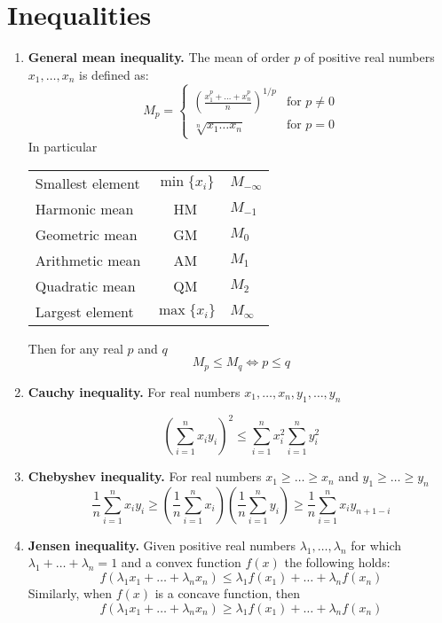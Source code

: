 \documentclass{article}
\begin{document}
\section*{Inequalities}
	\begin{enumerate}
	\item \textbf{General mean inequality.}
	The mean of order $p$ of positive real numbers $x_1,\dots,x_n$ is defined as:
	$$M_p=
	\begin{cases}
	\left(\frac{x_1^p+ \dots + x_n^p}{n}\right)^{1/p} &\text{for } p \ne 0 \\
	\sqrt[n]{x_1 \dots x_n}                           &\text{for } p=0
	\end{cases}
	$$
	In particular 
	\begin{center}
		\begin{tabular}{lcl}
			Smallest element & $\min\{x_i\}$ & $M_{-\infty}$ \\
			Harmonic mean & HM & $M_{-1}$ \\
			Geometric mean & GM & $M_0$ \\
			Arithmetic mean & AM & $M_1$ \\
			Quadratic mean & QM & $M_2$ \\			
			Largest element & $\max\{x_i\}$ & $M_{\infty}$ 
		\end{tabular}
	\end{center}
	Then for any real $p$ and $q$
	$$M_p \leq M_q \iff p \leq q $$

	\item \textbf{Cauchy inequality.}
	For real numbers $x_1, \dots , x_n, y_1, \dots , y_n$
	
	$$\left(\sum_{i=1}^{n} x_i y_i\right)^2 \leq \sum_{i=1}^{n} x_i^2 \sum_{i=1}^{n} y_i^2 $$
	 
	\item \textbf{Chebyshev inequality.}
	For real numbers $x_1 \geq \dots \geq x_n$ and $y_1 \geq \dots \geq y_n$
	$$\frac{1}{n} \sum_{i=1}^{n} x_iy_i
	\geq
	\left(\frac{1}{n}\sum_{i=1}^{n}x_i\right)
	\left(\frac{1}{n}\sum_{i=1}^{n}y_i\right) 
	\geq
	\frac{1}{n} \sum_{i=1}^{n} x_iy_{n+1-i} $$
	
	\item \textbf{Jensen inequality.}
	Given positive real numbers $\lambda_1,\hdots,\lambda_n$ for which $\lambda_1+\hdots+\lambda_n=1$  and a convex function $f(x)$ the following holds:
	$$f(\lambda_1 x_1 + \hdots + \lambda_n x_n) \leq \lambda_1 f(x_1) + \hdots + \lambda_n f(x_n)$$
	Similarly, when $f(x)$ is a concave function, then 
	$$f(\lambda_1 x_1 + \hdots + \lambda_n x_n) \geq \lambda_1 f(x_1) + \hdots + \lambda_n f(x_n)$$
				
	\end{enumerate}
	
\end{document}
